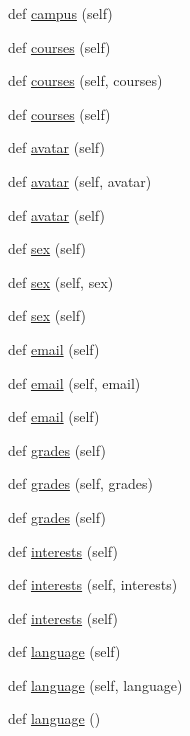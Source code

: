 \begin{DoxyCompactItemize}
\item 
def \hyperlink{classELO_1_1EntityUnit_1_1Student_a27ffe4ddb3005b38226c0a7b5eab0142}{campus} (self)
\item 
def \hyperlink{classELO_1_1EntityUnit_1_1Student_abcdd4a87d7b9c23ad34edc44c9849375}{courses} (self)
\item 
def \hyperlink{classELO_1_1EntityUnit_1_1Student_adbf17ba0da793bd8eebac214810a8833}{courses} (self, courses)
\item 
def \hyperlink{classELO_1_1EntityUnit_1_1Student_abcdd4a87d7b9c23ad34edc44c9849375}{courses} (self)
\item 
def \hyperlink{classELO_1_1EntityUnit_1_1Student_a1d93c73cc512d893edb1398f31f5df79}{avatar} (self)
\item 
def \hyperlink{classELO_1_1EntityUnit_1_1Student_af61c5dc32bb1efce250c57a3c270cf75}{avatar} (self, avatar)
\item 
def \hyperlink{classELO_1_1EntityUnit_1_1Student_a1d93c73cc512d893edb1398f31f5df79}{avatar} (self)
\item 
def \hyperlink{classELO_1_1EntityUnit_1_1Student_a4ebac84a31d7872ff7b0b4195ffd8821}{sex} (self)
\item 
def \hyperlink{classELO_1_1EntityUnit_1_1Student_a3cef596f2f2b9645e84bfe19ab1a0688}{sex} (self, sex)
\item 
def \hyperlink{classELO_1_1EntityUnit_1_1Student_a4ebac84a31d7872ff7b0b4195ffd8821}{sex} (self)
\item 
def \hyperlink{classELO_1_1EntityUnit_1_1Student_a6edd902b31b074cadf6f39e715924f89}{email} (self)
\item 
def \hyperlink{classELO_1_1EntityUnit_1_1Student_ac602a02690d2e25e1f07210c9241840d}{email} (self, email)
\item 
def \hyperlink{classELO_1_1EntityUnit_1_1Student_a6edd902b31b074cadf6f39e715924f89}{email} (self)
\item 
def \hyperlink{classELO_1_1EntityUnit_1_1Student_a91b709fe29804f89ab68882b8eed6fd8}{grades} (self)
\item 
def \hyperlink{classELO_1_1EntityUnit_1_1Student_aed8498737113ec215d7818c72238573e}{grades} (self, grades)
\item 
def \hyperlink{classELO_1_1EntityUnit_1_1Student_a91b709fe29804f89ab68882b8eed6fd8}{grades} (self)
\item 
def \hyperlink{classELO_1_1EntityUnit_1_1Student_a8e5d848197b740f89635152692eea39f}{interests} (self)
\item 
def \hyperlink{classELO_1_1EntityUnit_1_1Student_a3a03de65dfa9b1f245217c595ba86f79}{interests} (self, interests)
\item 
def \hyperlink{classELO_1_1EntityUnit_1_1Student_a8e5d848197b740f89635152692eea39f}{interests} (self)
\item 
def \hyperlink{classELO_1_1EntityUnit_1_1Student_a0af904a2855a4b3265c17a40e9b070e1}{language} (self)
\item 
def \hyperlink{classELO_1_1EntityUnit_1_1Student_ab427307a76034566a5ab420cd60b7c85}{language} (self, language)
\item 
def \hyperlink{classELO_1_1EntityUnit_1_1Student_a1492f283ebf33fe0e43f0502c82eb404}{language} ()
\end{DoxyCompactItemize}
